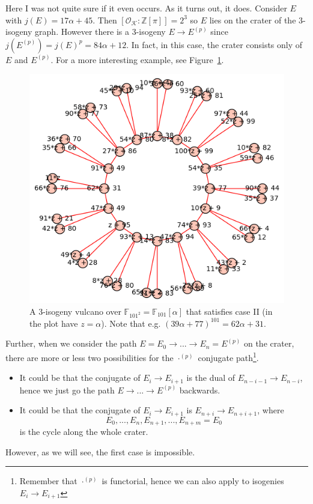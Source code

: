 \documentclass{scrartcl}
\newcommand{\Z}{\mathbb{Z}}
\newcommand{\F}{\mathbb{F}}
\newcommand{\K}{\mathcal{K}}
\renewcommand{\O}{\mathcal{O}}
\theoremstyle{definition}
\begin{document}
Here I was not quite sure if it even occurs. As it turns out, it does.
Consider $E$ with $j(E) = 17\alpha + 45$.
Then $[\O_\K : \Z[\pi]] = 2^3$ so $E$ lies on the crater of the 3-isogeny graph.
However there is a 3-isogeny $E \to E^{(p)}$ since $j(E^{(p)}) = j(E)^p = 84 \alpha + 12$.
In fact, in this case, the crater consists only of $E$ and $E^{(p)}$.
For a more interesting example, see Figure~\ref{fig:example_II}.
\begin{figure}
    \includegraphics{./example_II.png}
    \caption{\label{fig:example_II} A 3-isogeny vulcano over $\F_{101^2} = \F_{101}[\alpha]$ that satisfies case II (in the plot have $z = \alpha$). Note that e.g. $(39\alpha + 77)^{101} = 62\alpha + 31$.}
\end{figure}

Further, when we consider the path $E = E_0 \to ... \to E_n = E^{(p)}$ on the crater, there are more or less two possibilities for the $\cdot^{(p)}$ conjugate path\footnote{Remember that $\cdot^{(p)}$ is functorial, hence we can also apply to isogenies $E_i \to E_{i + 1}$}.
\begin{itemize}
    \item It could be that the conjugate of $E_i \to E_{i + 1}$ is the dual of $E_{n - i - 1} \to E_{n - i}$, hence we just go the path $E \to ... \to E^{(p)}$ backwards.
    \item It could be that the conjugate of $E_i \to E_{i + 1}$ is $E_{n + i} \to E_{n + i + 1}$, where
    \begin{equation*}
        E_0, ..., E_n, E_{n + 1}, ..., E_{n + m} = E_0
    \end{equation*}
    is the cycle along the whole crater.
\end{itemize}
However, as we will see, the first case is impossible.
\end{document}
